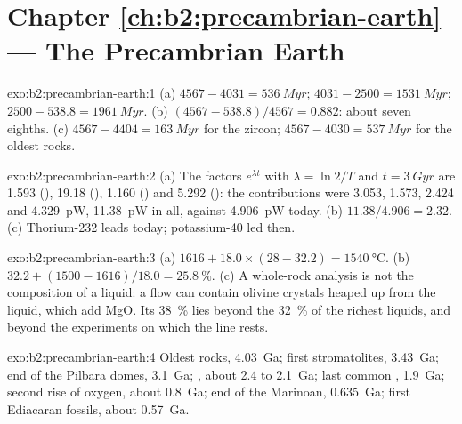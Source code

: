 \section*{Chapter \ref{ch:b2:precambrian-earth} --- The Precambrian Earth}

\begin{solution}{exo:b2:precambrian-earth:1}
(a)  $4567 - 4031 = \qty{536}{Myr}$;  $4031 - 2500 = \qty{1531}{Myr}$;
 $2500 - 538.8 = \qty{1961}{Myr}$. (b) $(4567 - 538.8)/4567 = 0.882$: about seven
eighths. (c) $4567 - 4404 = \qty{163}{Myr}$ for the zircon; $4567 - 4030 = \qty{537}{Myr}$ for
the oldest rocks.
\end{solution}

\begin{solution}{exo:b2:precambrian-earth:2}
(a) The factors $e^{\lambda t}$ with $\lambda = \ln2/T$ and $t = \qty{3}{Gyr}$ are 1.593
(), 19.18 (), 1.160 () and 5.292 (): the
contributions were 3.053, 1.573, 2.424 and \qty{4.329}{pW}, \qty{11.38}{pW} in all, against
\qty{4.906}{pW} today. (b) $11.38/4.906 = 2.32$. (c) Thorium-232 leads today; potassium-40 led
then.
\end{solution}

\begin{solution}{exo:b2:precambrian-earth:3}
(a) $1616 + 18.0\times(28 - 32.2) = \qty{1540}{\celsius}$. (b) $32.2 + (1500 - 1616)/18.0 =
\qty{25.8}{\percent}$. (c) A whole-rock analysis is not the composition of a liquid: a
 flow can contain olivine crystals heaped up from the liquid, which add MgO. Its
\qty{38}{\percent} lies beyond the \qty{32}{\percent} of the richest  liquids, and
beyond the experiments on which the line rests.
\end{solution}

\begin{solution}{exo:b2:precambrian-earth:4}
Oldest rocks, \qty{4.03}{Ga}; first stromatolites, \qty{3.43}{Ga}; end of the Pilbara domes,
\qty{3.1}{Ga}; , about 2.4 to \qty{2.1}{Ga}; last common ,
\qty{1.9}{Ga}; second rise of oxygen, about \qty{0.8}{Ga}; end of the Marinoan,
\qty{0.635}{Ga}; first Ediacaran fossils, about \qty{0.57}{Ga}.
\end{solution}

